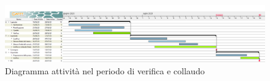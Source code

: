 \documentclass[../piano-di-progetto.tex]{subfiles}
\begin{document}
\newpage
\begin{landscape}
    \begin{figure}[H]
        \centering
        \includegraphics[width=24cm]{img/verifica.png}
        \caption{Diagramma attività nel periodo di verifica e collaudo}
      \end{figure}
\end{landscape}
\end{document}

